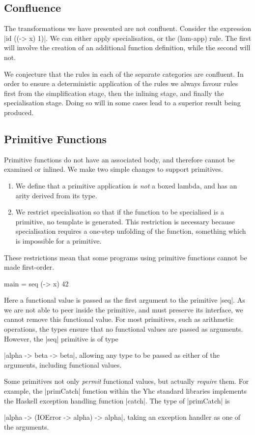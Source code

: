 \documentclass[preprint]{sigplanconf}
\begin{document}
\subsection{Confluence}

The transformations we have presented are not confluent. Consider the expression |id ((\x -> x) 1)|. We can either apply specialisation, or the (lam-app) rule. The first will involve the creation of an additional function definition, while the second will not.

We conjecture that the rules in each of the separate categories are confluent. In order to ensure a deterministic application of the rules we always favour rules first from the simplification stage, then the inlining stage, and finally the specialisation stage. Doing so will in some cases lead to a superior result being produced. 

\subsection{Primitive Functions}
\label{sec:primitives}

Primitive functions do not have an associated body, and therefore cannot be examined or inlined. We make two simple changes to support primitives.

\begin{enumerate}
\item We define that a primitive application is \textit{not} a boxed lambda, and has an arity derived from its type.
\item We restrict specialisation so that if the function to be specialised is a primitive, no template is generated. This restriction is necessary because specialisation requires a one-step unfolding of the function, something which is impossible for a primitive.
\end{enumerate}

These restrictions mean that some programs using primitive functions cannot be made first-order.

\begin{example}
\begin{code}
main = seq (\x -> x) 42
\end{code}

Here a functional value is passed as the first argument to the primitive |seq|. As we are not able to peer inside the primitive, and must preserve its interface, we cannot remove this functional value. For most primitives, such as arithmetic operations, the types ensure that no functional values are passed as arguments. However, the |seq| primitive is of type \ignore|alpha -> beta -> beta|, allowing any type to be passed as either of the arguments, including functional values.

Some primitives not only \textit{permit} functional values, but actually \textit{require} them. For example, the |primCatch| function within the Yhc standard libraries implements the Haskell exception handling function |catch|. The type of |primCatch| is \ignore|alpha -> (IOError -> alpha) -> alpha|, taking an exception handler as one of the arguments.
\end{example}
\end{document}
